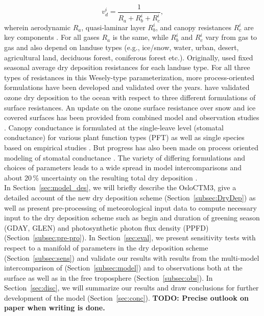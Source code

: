\documentclass[gmd, manuscript]{copernicus}
\begin{document}
\begin{equation}
  v^i_d = \frac{1}{R_a + R^i_b + R^i_c},
  \label{eq:drydep_velo}
\end{equation}
wherein aerodynamic $R_a$, quasi-laminar layer $R^i_b$, and canopy resistances $R^i_c$ are key components \citep{AE:Wesely1989}. For all gases $R_a$ is the same, while $R^i_b$ and $R^i_c$ vary from gas to gas and also depend on landuse types (e.g., ice/snow, water, urban, desert, agricultural land, deciduous forest, coniferous forest etc.). Originally, \citet{AE:Wesely1989} used fixed seasonal average dry deposition resistances for each landuse type. For all three types of resistances in this Wesely-type parameterization, more process-oriented formulations have been developed and validated over the years. \citet{ACP:Luhar2017} have validated ozone dry deposition to the ocean with respect to three different formulations of surface resistances. An update on the ozone surface resistance over snow and ice covered surfaces has been provided from combined model and observation studies \citep[e.g., $v^\chem{O_3}_\text{ice/snow} = 1/10000\,\unit{cm s^{-1}}$,][]{ACP:Helmig2007}. Canopy conductance is formulated at the single-leave level (stomatal conductance) for various plant function types (PFT) as well as single species based on empirical studies \citep{PTRS:Jarvis1976, BallBerry1987, ACP:Simpson2012, ICP:MappingManual2017}. But progress has also been made on process oriented modeling of stomatal conductance \citep{PP:Buckley2017}. The variety of differing formulations and choices of parameters leads to a wide spread in model intercomparisons \citep{ACP:Hardacre2015} and about 20\,\unit{\%} uncertainty on the resulting total dry deposition \citep{ACP:Monks2015}.\\

In Section~\ref{sec:model_des}, we will briefly describe the OsloCTM3, give a detailed account of the new dry deposition scheme (Section~\ref{subsec:DryDep}) as well as present pre-processing of meteorological input data to compute necessary input to the dry deposition scheme such as begin and duration of greening season (GDAY, GLEN) and photosynthetic photon flux density (PPFD) (Section~\ref{subsec:pre-pro}). In Section~\ref{sec:eval}, we present sensitivity tests with respect to a manifold of parameters in the dry deposition scheme (Section~\ref{subsec:sens}) and validate our results with results from the multi-model intercomparison of \citet{ACP:Hardacre2015} (Section~\ref{subsec:model}) and to observations both at the surface as well as in the free troposphere (Section~\ref{subsec:obs}). In Section~\ref{sec:disc}, we will summarize our results and draw conclusions for further development of the model (Section~\ref{sec:conc}).
{\bf TODO: Precise outlook on paper when writing is done.}
\end{document}
